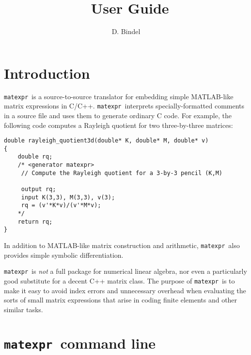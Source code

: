 \documentclass[12pt]{article}
\title{\matexpr\ User Guide}
\author{D. Bindel}
\newcommand{\matexpr}{\texttt{matexpr}}
\begin{document}
\maketitle


\section{Introduction}

\matexpr\ is a source-to-source translator for embedding simple MATLAB-like
matrix expressions in C/C++.  \matexpr\ interprets specially-formatted
comments in a source file and uses them to generate ordinary C
code.  For example, the following code computes a Rayleigh quotient
for two three-by-three matrices:
\begin{verbatim}
double rayleigh_quotient3d(double* K, double* M, double* v)
{
    double rq;
    /* <generator matexpr>
     // Compute the Rayleigh quotient for a 3-by-3 pencil (K,M)

     output rq;
     input K(3,3), M(3,3), v(3);
     rq = (v'*K*v)/(v'*M*v);
    */
    return rq;
}
\end{verbatim}

In addition to MATLAB-like matrix construction and arithmetic, \matexpr\
also provides simple symbolic differentiation.

\matexpr\ is \emph{not} a full package for numerical linear algebra, nor
even a particularly good substitute for a decent C++ matrix class.
The purpose of \matexpr\ is to make it easy to avoid index errors and
unnecessary overhead when evaluating the sorts of small matrix expressions
that arise in coding finite elements and other similar tasks.


\section{\matexpr\ command line}
\end{document}
